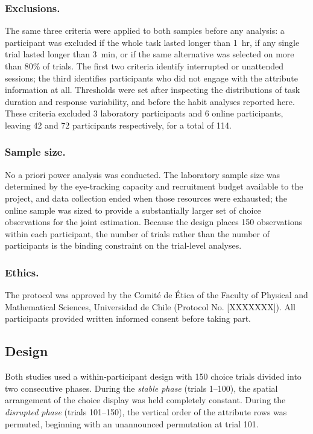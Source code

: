 \documentclass[man,natbib,floatsintext]{apa7}
\begin{document}
\subsubsection{Exclusions.} The same three criteria were applied to both samples before any analysis: a participant was excluded if the whole task lasted longer than 1~hr, if any single trial lasted longer than 3~min, or if the same alternative was selected on more than 80\% of trials. The first two criteria identify interrupted or unattended sessions; the third identifies participants who did not engage with the attribute information at all. Thresholds were set after inspecting the distributions of task duration and response variability, and before the habit analyses reported here. These criteria excluded 3 laboratory participants and 6 online participants, leaving 42 and 72 participants respectively, for a total of 114.

\subsubsection{Sample size.} No a priori power analysis was conducted. The laboratory sample size was determined by the eye-tracking capacity and recruitment budget available to the project, and data collection ended when those resources were exhausted; the online sample was sized to provide a substantially larger set of choice observations for the joint estimation. Because the design places 150 observations within each participant, the number of trials rather than the number of participants is the binding constraint on the trial-level analyses. %

\subsubsection{Ethics.} The protocol was approved by the Comit\'{e} de \'{E}tica of the Faculty of Physical and Mathematical Sciences, Universidad de Chile (Protocol No. [XXXXXXX]). All participants provided written informed consent before taking part.

\subsection{Design}

Both studies used a within-participant design with 150 choice trials divided into two consecutive phases. During the \emph{stable phase} (trials 1--100), the spatial arrangement of the choice display was held completely constant. During the \emph{disrupted phase} (trials 101--150), the vertical order of the attribute rows was permuted, beginning with an unannounced permutation at trial 101.
\end{document}
